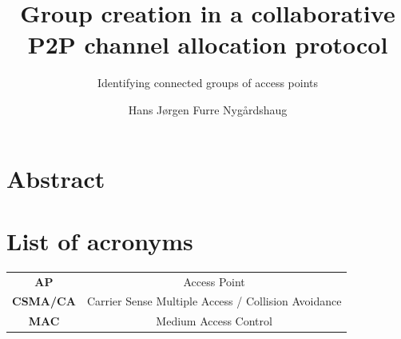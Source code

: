 \documentclass[a4paper,UKenglish]{report}
\title{Group creation in a collaborative P2P channel allocation protocol}
\subtitle{Identifying connected groups of access points}
\author{Hans Jørgen Furre Nygårdshaug}
\begin{document}
\duoforside[dept={Institutt for informatikk},
  program={Informatikk: programmering og nettverk},
  long]
\section*{Abstract}

\clearpage
\section*{List of acronyms}
\begin{tabular}{ c c }
	\textbf{AP} & Access Point\\ 
	\textbf{CSMA/CA} & Carrier Sense Multiple Access / Collision Avoidance\\
	\textbf{MAC} & Medium Access Control\\
\end{tabular}
\tableofcontents

\end{document}
